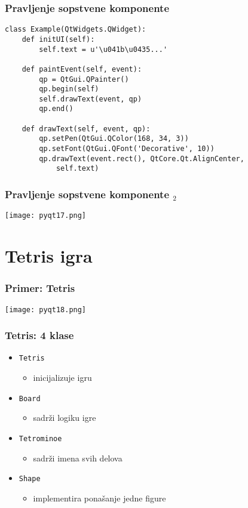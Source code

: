\documentclass[utf8,compress,aspectratio=169]{beamer}
\begin{document}
\begin{frame}
  \frametitle{Pravljenje sopstvene komponente}
\begin{verbatim}
class Example(QtWidgets.QWidget):
    def initUI(self):
        self.text = u'\u041b\u0435...'

    def paintEvent(self, event):
        qp = QtGui.QPainter()
        qp.begin(self)
        self.drawText(event, qp)
        qp.end()

    def drawText(self, event, qp):
        qp.setPen(QtGui.QColor(168, 34, 3))
        qp.setFont(QtGui.QFont('Decorative', 10))
        qp.drawText(event.rect(), QtCore.Qt.AlignCenter,
            self.text)
\end{verbatim}
\end{frame}

\begin{frame}[fragile]
  \frametitle{Pravljenje sopstvene komponente $_2$}
\begin{center}
\texttt{[image: pyqt17.png]}
\end{center}
\end{frame}

\section[Tetris]{Tetris igra}

\begin{frame}[fragile]
  \frametitle{Primer: Tetris}
\begin{center}
\texttt{[image: pyqt18.png]}
\end{center}
\end{frame}

\begin{frame}[fragile]
  \frametitle{Tetris: 4 klase}
  \begin{itemize}
    \item \texttt{Tetris}
    \begin{itemize}
      \item inicijalizuje igru
    \end{itemize}
    \item \texttt{Board}
    \begin{itemize}
      \item sadrži logiku igre
    \end{itemize}
    \item \texttt{Tetrominoe}
    \begin{itemize}
      \item sadrži imena svih delova
    \end{itemize}
    \item \texttt{Shape}
    \begin{itemize}
      \item implementira ponašanje jedne figure
    \end{itemize}
  \end{itemize}
\end{frame}
\end{document}
